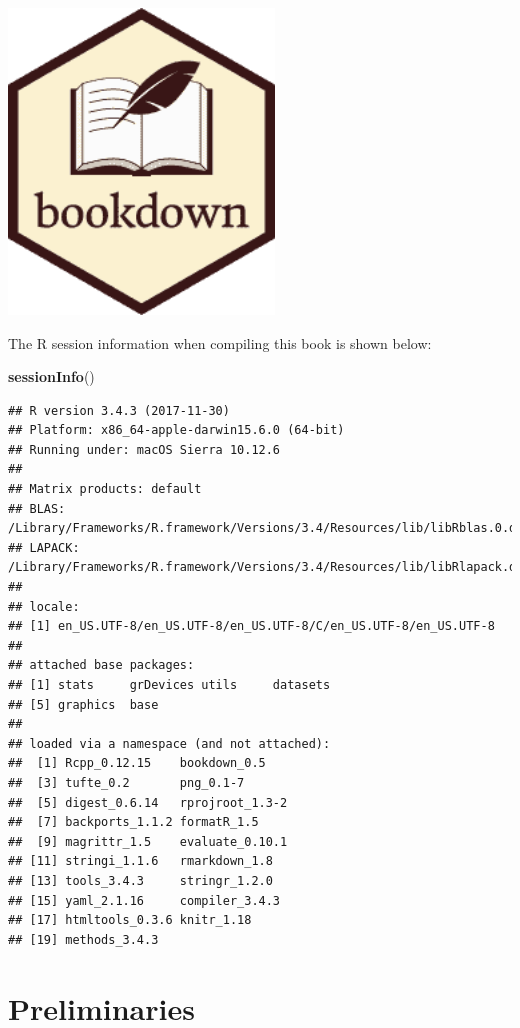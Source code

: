 \documentclass[english,10pt,a4paper,oneside]{book}
\newenvironment{Shaded}{\begin{snugshade}}{\end{snugshade}}
\newcommand{\KeywordTok}[1]{\textcolor[rgb]{0.12,0.11,0.11}{\textbf{#1}}}
\newcommand{\NormalTok}[1]{\textcolor[rgb]{0.12,0.11,0.11}{#1}}
\theoremstyle{definition}
\theoremstyle{definition}
\theoremstyle{definition}
\theoremstyle{remark}
\begin{document}
\includegraphics[width=2.78in]{figures/bookdown_hex_logo}

The R session information when compiling this book is shown below:

\begin{Shaded}
\begin{Highlighting}[]
\KeywordTok{sessionInfo}\NormalTok{()}
\end{Highlighting}
\end{Shaded}

\begin{verbatim}
## R version 3.4.3 (2017-11-30)
## Platform: x86_64-apple-darwin15.6.0 (64-bit)
## Running under: macOS Sierra 10.12.6
## 
## Matrix products: default
## BLAS: /Library/Frameworks/R.framework/Versions/3.4/Resources/lib/libRblas.0.dylib
## LAPACK: /Library/Frameworks/R.framework/Versions/3.4/Resources/lib/libRlapack.dylib
## 
## locale:
## [1] en_US.UTF-8/en_US.UTF-8/en_US.UTF-8/C/en_US.UTF-8/en_US.UTF-8
## 
## attached base packages:
## [1] stats     grDevices utils     datasets 
## [5] graphics  base     
## 
## loaded via a namespace (and not attached):
##  [1] Rcpp_0.12.15    bookdown_0.5   
##  [3] tufte_0.2       png_0.1-7      
##  [5] digest_0.6.14   rprojroot_1.3-2
##  [7] backports_1.1.2 formatR_1.5    
##  [9] magrittr_1.5    evaluate_0.10.1
## [11] stringi_1.1.6   rmarkdown_1.8  
## [13] tools_3.4.3     stringr_1.2.0  
## [15] yaml_2.1.16     compiler_3.4.3 
## [17] htmltools_0.3.6 knitr_1.18     
## [19] methods_3.4.3
\end{verbatim}

\chapter*{Preliminaries}\label{preliminaries}
\end{document}
